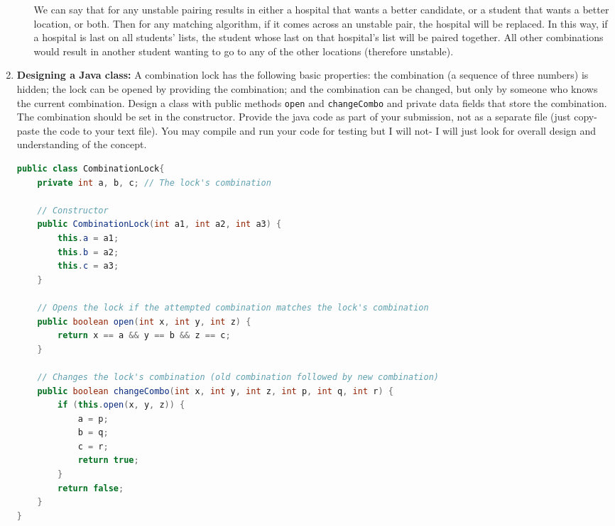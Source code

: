 \documentclass[letterpaper, 11pt]{article}
\begin{document}
\begin{enumerate}[leftmargin=*]
\begin{enumerate}
        We can say that for any unstable pairing results in either a hospital that wants a better candidate, or a student that wants a better location, or both. Then for any matching algorithm, if it comes across an unstable pair, the hospital will be replaced. In this way, if a hospital is last on all students' lists, the student whose last on that hospital's list will be paired together. All other combinations would result in another student wanting to go to any of the other locations (therefore unstable).
        
    \end{enumerate}

    \item \textbf{Designing a Java class:} A combination lock has the following basic properties: the combination (a sequence of three numbers) is hidden; the lock can be opened by providing the combination; and the combination can be changed, but only by someone who knows the current combination. Design a class with public methods \texttt{open} and \texttt{changeCombo} and private data fields that store the combination. The combination should be set in the constructor. Provide the java code as part of your submission, not as a separate file (just copy-paste the code to your text file). You may compile and run your code for testing but I will not- I will just look for overall design and understanding of the concept.

\begin{tcolorbox}[breakable, title=\texttt{CombinationLock.java}]
\begin{lstlisting}[language=Java]
public class CombinationLock{
    private int a, b, c; // The lock's combination

    // Constructor
    public CombinationLock(int a1, int a2, int a3) {
        this.a = a1;
        this.b = a2;
        this.c = a3;
    }

    // Opens the lock if the attempted combination matches the lock's combination
    public boolean open(int x, int y, int z) {
        return x == a && y == b && z == c;
    }

    // Changes the lock's combination (old combination followed by new combination)
    public boolean changeCombo(int x, int y, int z, int p, int q, int r) {
        if (this.open(x, y, z)) {
            a = p;
            b = q;
            c = r;
            return true;
        }
        return false;
    }
}
\end{lstlisting}
\end{tcolorbox}


\end{enumerate}
\end{document}
